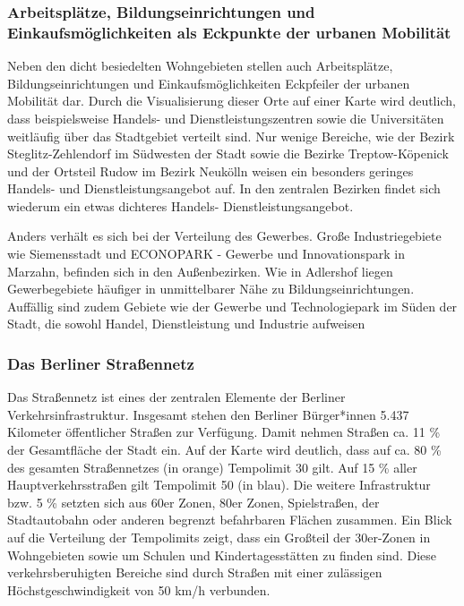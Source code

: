 \subsubsection{Arbeitsplätze, Bildungseinrichtungen und Einkaufsmöglichkeiten als Eckpunkte der urbanen Mobilität}

Neben den dicht besiedelten Wohngebieten stellen auch Arbeitsplätze, Bildungseinrichtungen und Einkaufsmöglichkeiten Eckpfeiler der urbanen Mobilität dar. Durch die Visualisierung dieser Orte auf einer Karte wird deutlich, dass beispielsweise Handels- und Dienstleistungszentren sowie die Universitäten weitläufig über das Stadtgebiet verteilt sind. Nur wenige Bereiche, wie der Bezirk Steglitz-Zehlendorf im Südwesten der Stadt sowie die Bezirke Treptow-Köpenick und der Ortsteil Rudow im Bezirk Neukölln weisen ein besonders geringes Handels- und Dienstleistungsangebot auf. In den zentralen Bezirken findet sich wiederum ein etwas dichteres Handels- Dienstleistungsangebot.

Anders verhält es sich bei der Verteilung des Gewerbes. Große Industriegebiete wie Siemensstadt und ECONOPARK - Gewerbe und Innovationspark in Marzahn, befinden sich in den Außenbezirken. Wie in Adlershof liegen Gewerbegebiete häufiger in unmittelbarer Nähe zu Bildungseinrichtungen. Auffällig sind zudem Gebiete wie der Gewerbe und Technologiepark im Süden der Stadt, die sowohl Handel, Dienstleistung und Industrie aufweisen


\subsubsection{Das Berliner Straßennetz}

Das Straßennetz ist eines der zentralen Elemente der Berliner Verkehrsinfrastruktur. Insgesamt stehen den Berliner Bürger*innen 5.437 Kilometer öffentlicher Straßen zur Verfügung. Damit nehmen Straßen ca. 11 \% der Gesamtfläche der Stadt ein. Auf der Karte wird deutlich, dass auf ca. 80 \% des gesamten Straßennetzes (in orange) Tempolimit 30 gilt. Auf 15 \% aller Hauptverkehrsstraßen gilt Tempolimit 50 (in blau). Die weitere Infrastruktur bzw. 5 \% setzten sich aus 60er Zonen, 80er Zonen, Spielstraßen, der Stadtautobahn oder anderen begrenzt befahrbaren Flächen zusammen. Ein Blick auf die Verteilung der Tempolimits zeigt, dass ein Großteil der 30er-Zonen in Wohngebieten sowie um Schulen und Kindertagesstätten zu finden sind. Diese verkehrsberuhigten Bereiche sind durch Straßen mit einer zulässigen Höchstgeschwindigkeit von 50 km/h verbunden.

